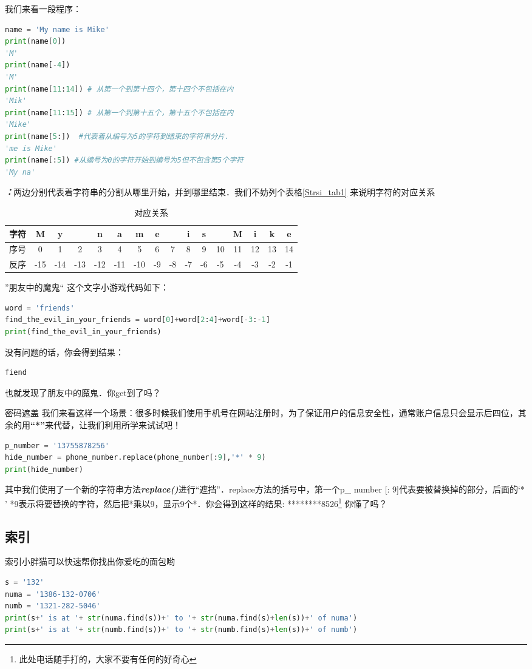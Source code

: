 我们来看一段程序：
\begin{lstlisting}[language=python]
name = 'My name is Mike'
print(name[0])
'M'
print(name[-4])
'M'
print(name[11:14]) # 从第一个到第十四个，第十四个不包括在内
'Mik'
print(name[11:15]) # 从第一个到第十五个，第十五个不包括在内
'Mike'
print(name[5:])  #代表着从编号为5的字符到结束的字符串分片．
'me is Mike'
print(name[:5]) #从编号为0的字符开始到编号为5但不包含第5个字符
'My na'
\end{lstlisting}
\textbf{\textsl{：}}两边分别代表着字符串的分割从哪里开始，并到哪里结束．我们不妨列个表格\autoref{Strsi_tab1} 来说明字符的对应关系
\begin{table}[ht]
\centering
\caption{对应关系}\label{Strsi_tab1}
\begin{tabular}{|c|c|c|c|c|c|c|c|c|c|c|c|c|c|c|c|}
\hline
 字符  & M & y &   & n & a & m & e &   & i & s &   & M & i & k &e\\
\hline
 序号  & 0 & 1 & 2 & 3 & 4 & 5 & 6 & 7 & 8 & 9 & 10 & 11 & 12 & 13 & 14\\
\hline
 反序  & -15 & -14 & -13 & -12 & -11 & -10 & -9 & -8 & -7 & -6 & -5 & -4 & -3 & -2 & -1\\
\hline
\end{tabular}
\end{table}
\begin{example}{”朋友中的魔鬼“}
这个文字小游戏代码如下：
\begin{lstlisting}[language=python]
word = 'friends'
find_the_evil_in_your_friends = word[0]+word[2:4]+word[-3:-1] 
print(find_the_evil_in_your_friends)
\end{lstlisting}
没有问题的话，你会得到结果：
\begin{lstlisting}[language=python]
fiend
\end{lstlisting}
也就发现了朋友中的魔鬼．你get到了吗？
\end{example}
\begin{example}{密码遮盖}
我们来看这样一个场景：很多时候我们使用手机号在网站注册时，为了保证用户的信息安全性，通常账户信息只会显示后四位，其余的用\textbf{“*”}来代替，让我们利用所学来试试吧！
\begin{lstlisting}[language=python]
p_number = '13755878256'
hide_number = phone_number.replace(phone_number[:9],'*' * 9)
print(hide_number)
\end{lstlisting}
其中我们使用了一个新的字符串方法\textbf{\textsl{replace()}}进行“遮挡”．replace方法的括号中，第一个p_ number [: 9]代表要被替换掉的部分，后面的‘* ' *9表示将要替换的字符，然后把*乘以9，显示9个*．你会得到这样的结果: ********8526\footnote{此处电话随手打的，大家不要有任何的好奇心}
你懂了吗？

\end{example}

\subsection{索引}
索引小胖猫可以快速帮你找出你爱吃的面包哟
\begin{lstlisting}[language=python]
s = '132'
numa = '1386-132-0706'
numb = '1321-282-5046'
print(s+' is at '+ str(numa.find(s))+' to '+ str(numa.find(s)+len(s))+' of numa')
print(s+' is at '+ str(numb.find(s))+' to '+ str(numb.find(s)+len(s))+' of numb')
\end{lstlisting}